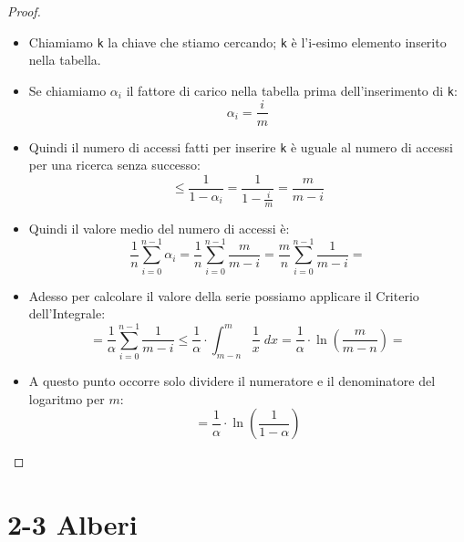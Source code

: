 \documentclass{article}
\begin{document}
\begin{proof}
    $ $\newline
    \begin{itemize}
        \item Chiamiamo \verb|k| la chiave che stiamo cercando; \verb|k| è l'i-esimo elemento inserito nella tabella.
        \item Se chiamiamo $\alpha_i$ il fattore di carico nella tabella prima dell'inserimento di \verb|k|:
            \begin{equation*}
                \alpha_i = \frac{i}{m}
            \end{equation*}
        \item Quindi il numero di accessi fatti per inserire \verb|k| è uguale al numero di accessi per una ricerca senza successo:
            \begin{equation*}
                \leq \frac{1}{1 - \alpha_i} = \frac{1}{1 - \frac{i}{m}} = \frac{m}{m - i}
            \end{equation*}
        \item Quindi il valore medio del numero di accessi è:
            \begin{equation*}
                \frac{1}{n} \sum_{i = 0}^{n - 1} \alpha_i = \frac{1}{n} \sum_{i = 0}^{n - 1} \frac{m}{m - i} = \frac{m}{n} \sum_{i = 0}^{n - 1} \frac{1}{m - i} =
            \end{equation*}
        \item Adesso per calcolare il valore della serie possiamo applicare il Criterio dell'Integrale:
            \begin{equation*}
                = \frac{1}{\alpha} \sum_{i = 0}^{n - 1} \frac{1}{m - i} \leq \frac{1}{\alpha} \cdot \int_{m - n}^m \frac{1}{x} \; dx = \frac{1}{\alpha} \cdot \ln(\frac{m}{m - n}) =
            \end{equation*}
        \item A questo punto occorre solo dividere il numeratore e il denominatore del logaritmo per $m$:
            \begin{equation*}
                = \frac{1}{\alpha} \cdot \ln(\frac{1}{1 - \alpha})
            \end{equation*}
    \end{itemize}
\end{proof}

\section{2-3 Alberi}
\end{document}
